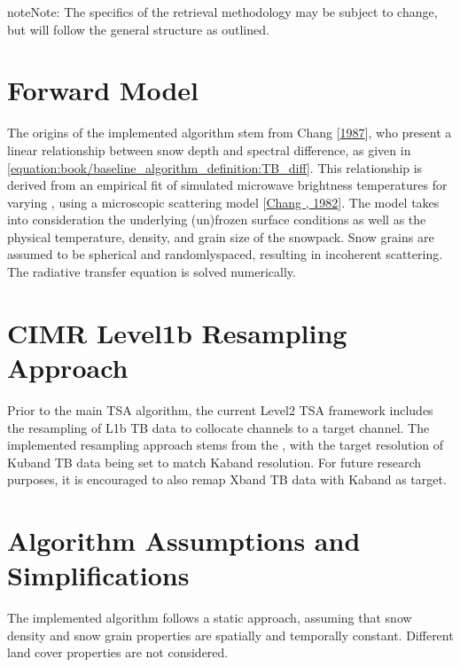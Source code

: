 \documentclass[letterpaper,10pt,english]{jupyterBook}
\begin{document}
\begin{sphinxadmonition}{note}{Note:}
\sphinxAtStartPar
The specifics of the retrieval methodology may be subject to change, but will follow the general structure as outlined.
\end{sphinxadmonition}


\section{Forward Model}
\label{\detokenize{book/baseline_algorithm_definition:forward-model}}
\sphinxAtStartPar
The origins of the implemented algorithm stem from Chang  {[}\hyperlink{cite.book/references:id7}{1987}{]}, who present a linear relationship between snow depth and spectral difference, as given in \eqref{equation:book/baseline_algorithm_definition:TB_diff}.
This relationship is derived from an empirical fit of simulated microwave brightness temperatures for varying {\hyperref[\detokenize{book/acronyms:term-SWE}]{}}, using a microscopic scattering model {[}\hyperlink{cite.book/references:id23}{Chang , 1982}{]}.
The model takes into consideration the underlying (un\sphinxhyphen{})frozen surface conditions as well as the physical temperature, density, and grain size of the snowpack.
Snow grains are assumed to be spherical and randomly\sphinxhyphen{}spaced, resulting in incoherent scattering.
The radiative transfer equation is solved numerically.


\section{CIMR Level\sphinxhyphen{}1b Resampling Approach}
\label{\detokenize{book/baseline_algorithm_definition:cimr-level-1b-resampling-approach}}
\sphinxAtStartPar
Prior to the main TSA algorithm, the current {\hyperref[\detokenize{book/acronyms:term-CIMR}]{}} Level\sphinxhyphen{}2 TSA framework includes the resampling of L1b TB data to collocate channels to a target channel.
The implemented resampling approach stems from the , with the target resolution of Ku\sphinxhyphen{}band TB data being set to match Ka\sphinxhyphen{}band resolution.
For future research purposes, it is encouraged to also remap X\sphinxhyphen{}band TB data with Ka\sphinxhyphen{}band as target.


\section{Algorithm Assumptions and Simplifications}
\label{\detokenize{book/baseline_algorithm_definition:algorithm-assumptions-and-simplifications}}
\sphinxAtStartPar
The implemented algorithm follows a static approach, assuming that snow density and snow grain properties are spatially and temporally constant.
Different land cover properties are not considered.
\end{document}
